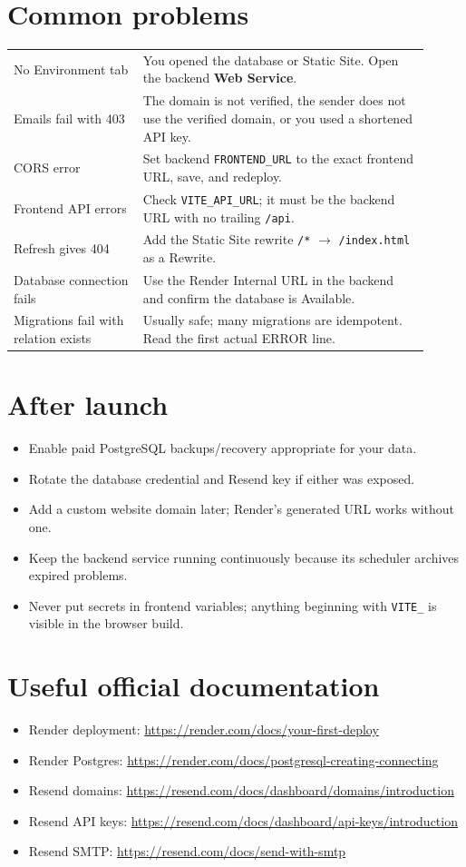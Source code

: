 \documentclass[11pt]{article}
\newcommand{\code}[1]{\texttt{\small #1}}
\begin{document}
\section{Common problems}
\begin{longtable}{p{0.29\linewidth}p{0.62\linewidth}}
No Environment tab & You opened the database or Static Site. Open the backend \textbf{Web Service}.\\
Emails fail with 403 & The domain is not verified, the sender does not use the verified domain, or you used a shortened API key.\\
CORS error & Set backend \code{FRONTEND\_URL} to the exact frontend URL, save, and redeploy.\\
Frontend API errors & Check \code{VITE\_API\_URL}; it must be the backend URL with no trailing \code{/api}.\\
Refresh gives 404 & Add the Static Site rewrite \code{/*} $\rightarrow$ \code{/index.html} as a Rewrite.\\
Database connection fails & Use the Render Internal URL in the backend and confirm the database is Available.\\
Migrations fail with relation exists & Usually safe; many migrations are idempotent. Read the first actual ERROR line.\\
\end{longtable}

\section{After launch}
\begin{itemize}
 \item Enable paid PostgreSQL backups/recovery appropriate for your data.
 \item Rotate the database credential and Resend key if either was exposed.
 \item Add a custom website domain later; Render's generated URL works without one.
 \item Keep the backend service running continuously because its scheduler archives expired problems.
 \item Never put secrets in frontend variables; anything beginning with \code{VITE\_} is visible in the browser build.
\end{itemize}

\section{Useful official documentation}
\begin{itemize}
 \item Render deployment: \url{https://render.com/docs/your-first-deploy}
 \item Render Postgres: \url{https://render.com/docs/postgresql-creating-connecting}
 \item Resend domains: \url{https://resend.com/docs/dashboard/domains/introduction}
 \item Resend API keys: \url{https://resend.com/docs/dashboard/api-keys/introduction}
 \item Resend SMTP: \url{https://resend.com/docs/send-with-smtp}
\end{itemize}
\end{document}
